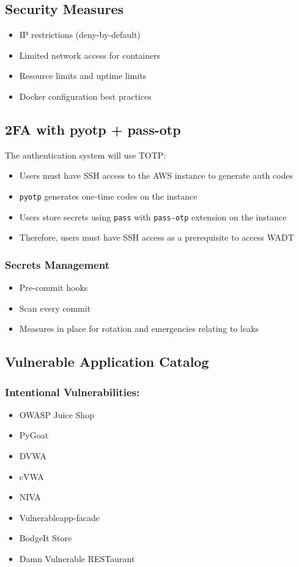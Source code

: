 \documentclass[12pt,titlepage]{article}
\begin{document}
\subsection{Security Measures}
\begin{itemize}
	\item IP restrictions (deny-by-default)
	\item Limited network access for containers
	\item Resource limits and uptime limits
	\item Docker configuration best practices
\end{itemize}

\subsection{2FA with pyotp + pass-otp}

The authentication system will use TOTP:
\begin{itemize}
    \item Users must have SSH access to the AWS instance to generate auth codes
    \item \texttt{pyotp} generates one-time codes on the instance
    \item Users store secrets using \texttt{pass} with \texttt{pass-otp} extension on the instance
    \item Therefore, users must have SSH access as a prerequisite to access WADT
\end{itemize}

\subsubsection{Secrets Management}
\begin{itemize}
    \item Pre-commit hooks
    \item Scan every commit
    \item Measures in place for rotation and emergencies relating to leaks
\end{itemize}

\subsection{Vulnerable Application Catalog}

\subsubsection{Intentional Vulnerabilities:}
\begin{itemize}
    \item OWASP Juice Shop
    \item PyGoat
    \item DVWA
    \item cVWA
    \item NIVA
    \item Vulnerableapp-facade
    \item BodgeIt Store
    \item Damn Vulnerable RESTaurant
\end{itemize}
\end{document}
